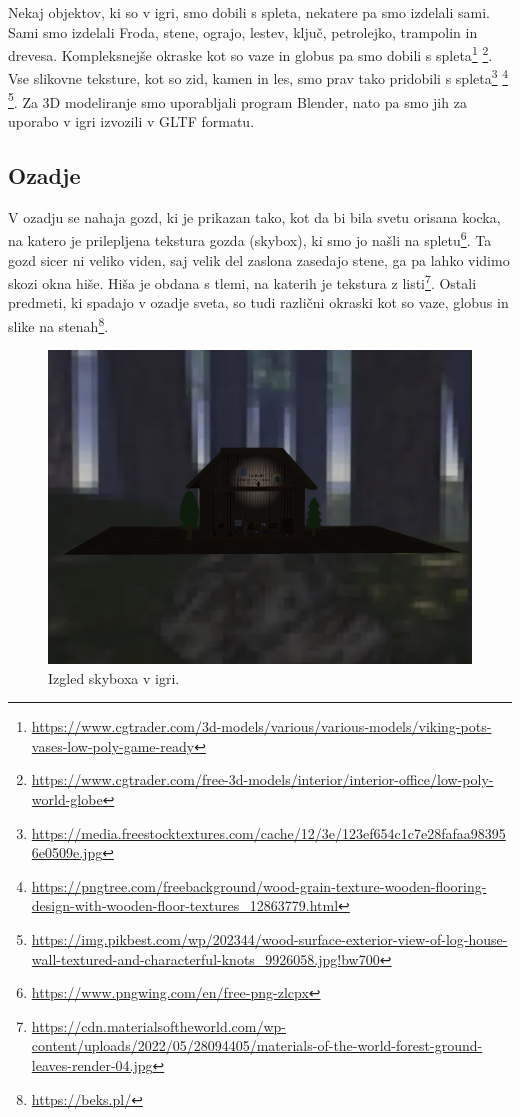\documentclass[a4paper,12pt]{article}
\begin{document}
Nekaj objektov, ki so v igri, smo dobili s spleta, nekatere pa smo izdelali sami. Sami smo izdelali Froda, stene, ograjo, lestev, ključ, petrolejko, trampolin in drevesa. Kompleksnejše okraske kot so vaze in globus pa smo dobili s spleta\footnote{\url{https://www.cgtrader.com/3d-models/various/various-models/viking-pots-vases-low-poly-game-ready}} \footnote{\url{https://www.cgtrader.com/free-3d-models/interior/interior-office/low-poly-world-globe}}. Vse slikovne teksture, kot so zid, kamen in les, smo prav tako pridobili s spleta\footnote{\url{https://media.freestocktextures.com/cache/12/3e/123ef654c1c7e28fafaa983956e0509e.jpg}} \footnote{\url{https://pngtree.com/freebackground/wood-grain-texture-wooden-flooring-design-with-wooden-floor-textures_12863779.html}} \footnote{\url{https://img.pikbest.com/wp/202344/wood-surface-exterior-view-of-log-house-wall-textured-and-characterful-knots_9926058.jpg!bw700}}. Za 3D modeliranje smo uporabljali program Blender, nato pa smo jih za uporabo v igri izvozili v GLTF formatu.

\subsection{Ozadje}
V ozadju se nahaja gozd, ki je prikazan tako, kot da bi bila svetu orisana kocka, na katero je prilepljena tekstura gozda (skybox), ki smo jo našli na spletu\footnote{\url{https://www.pngwing.com/en/free-png-zlcpx}}. Ta gozd sicer ni veliko viden, saj velik del zaslona zasedajo stene, ga pa lahko vidimo skozi okna hiše. Hiša je obdana s tlemi, na katerih je tekstura z listi\footnote{\url{https://cdn.materialsoftheworld.com/wp-content/uploads/2022/05/28094405/materials-of-the-world-forest-ground-leaves-render-04.jpg}}. Ostali predmeti, ki spadajo v ozadje sveta, so tudi različni okraski kot so vaze, globus in slike na stenah\footnote{\url{https://beks.pl/}}.

\begin{figure}[!htb]
    \begin{center}
        \includegraphics[width=0.8\columnwidth]{skybox.jpg}
        \caption{Izgled skyboxa v igri.}
    \end{center}
\end{figure}
\end{document}
